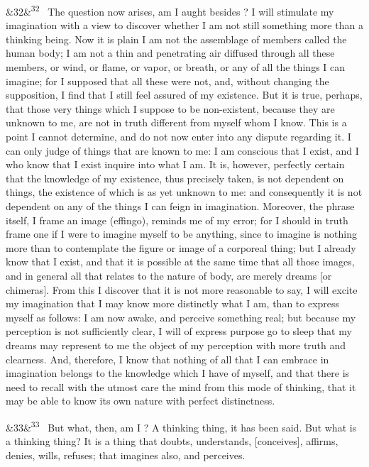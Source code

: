 \documentclass[12pt]{article}
\newcommand{\para}[1][]{\par\noindent\ifx&#1&\else\textsuperscript{\footnotesize #1}~\fi}
\begin{document}
\para[32] The question now arises, am I aught besides ? I will stimulate my imagination with a view to discover whether I am not still something more than a thinking being. Now it is plain I am not the assemblage of members called the human body; I am not a thin and penetrating air diffused through all these members, or wind, or flame, or vapor, or breath, or any of all the things I can imagine; for I supposed that all these were not, and, without changing the supposition, I find that I still feel assured of my existence. But it is true, perhaps, that those very things which I suppose to be non-existent, because they are unknown to me, are not in truth different from myself whom I know. This is a point I cannot determine, and do not now enter into any dispute regarding it. I can only judge of things that are known to me: I am conscious that I exist, and I who know that I exist inquire into what I am. It is, however, perfectly certain that the knowledge of my existence, thus precisely taken, is not dependent on things, the existence of which is as yet unknown to me: and consequently it is not dependent on any of the things I can feign in imagination. Moreover, the phrase itself, I frame an image (effingo), reminds me of my error; for I should in truth frame one if I were to imagine myself to be anything, since to imagine is nothing more than to contemplate the figure or image of a corporeal thing; but I already know that I exist, and that it is possible at the same time that all those images, and in general all that relates to the nature of body, are merely dreams [or chimeras]. From this I discover that it is not more reasonable to say, I will excite my imagination that I may know more distinctly what I am, than to express myself as follows: I am now awake, and perceive something real; but because my perception is not sufficiently clear, I will of express purpose go to sleep that my dreams may represent to me the object of my perception with more truth and clearness. And, therefore, I know that nothing of all that I can embrace in imagination belongs to the knowledge which I have of myself, and that there is need to recall with the utmost care the mind from this mode of thinking, that it may be able to know its own nature with perfect distinctness.

\para[33] But what, then, am I ? A thinking thing, it has been said. But what is a thinking thing? It is a thing that doubts, understands, [conceives], affirms, denies, wills, refuses; that imagines also, and perceives.
\end{document}
